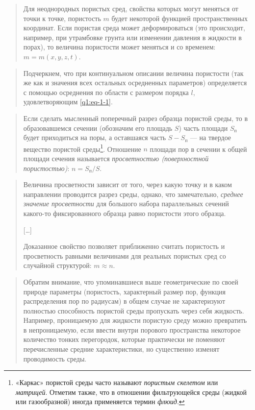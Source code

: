 \documentclass[12pt,a4paper]{article}
\newenvironment{textquote}{\begin{quote}\sloppy}{\end{quote}}
\begin{document}
\begin{textquote}
Для неоднородных пористых сред, свойства которых могут меняться от точки к точке, пористость $m$ будет некоторой функцией пространственных координат. Если пористая среда может деформироваться (это происходит, например, при утрамбовке грунта или изменении давления в жидкости в порах), то величина пористости может меняться и со временем: $m=m(x,y,z,t)$.
\end{textquote}

\begin{textquote}
Подчеркнем, что при континуальном описании величина пористости (так же как и значения всех остальных осредненных параметров) определяется с помощью осреднения по области с размером порядка $l$, удовлетворяющим \eqref{q1:eq-1-1}.
\end{textquote}

\begin{textquote}
Если сделать мысленный поперечный разрез образца пористой среды, то в образовавшемся сечении (обозначим его площадь $S$) часть площади $S_{\text{п}}$ будет приходиться на поры, а оставшаяся часть $S-S_{\text{п}}$ --- на твердое вещество пористой среды\footnote{«Каркас» пористой среды часто называют \textit{пористым скелетом} или \textit{матрицей}. Отметим также, что в отношении фильтрующейся среды (жидкой или газообразной) иногда применяется термин \textit{флюид}.}. Отношение $n$ площади пор в сечении к общей площади сечения называется \textit{просветностью (поверхностной пористостью)}: $n=S_{\text{п}}/S$.
\end{textquote}

\begin{textquote}
Величина просветности зависит от того, через какую точку и в каком направлении проводится разрез среды, однако, что замечательно, \textit{среднее значение просветности} для большого набора параллельных сечений какого-то фиксированного образца равно
пористости этого образца.

[…]

Доказанное свойство позволяет приближенно считать пористость и просветность равными величинами для реальных пористых сред со случайной структурой: $m\approx n$.
\end{textquote}

\begin{textquote}
Обратим внимание, что упоминавшиеся выше геометрические по своей природе параметры (пористость, характерный размер пор, функция распределения пор по радиусам) в общем случае не характеризуют полностью способность пористой среды пропускать через себя жидкость. Например, проницаемую для жидкости пористую среду можно превратить в непроницаемую, если ввести внутри порового пространства некоторое количество тонких перегородок, которые практически не поменяют перечисленные средние характеристики, но существенно изменят проводимость среды.
\end{textquote}
\end{document}
